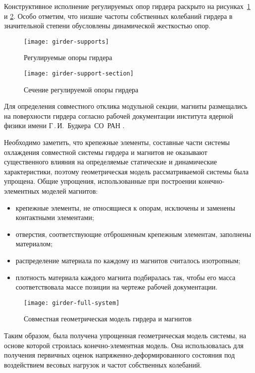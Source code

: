 Конструктивное исполнение регулируемых опор гирдера раскрыто на рисунках~\ref{fig:girder-supports} и \ref{fig:girder-support-section}. Особо отметим, что низшие частоты собственных колебаний гирдера в значительной степени обусловлены динамической жесткостью опор.

\begin{figure}[!htb]
	\centering
	\texttt{[image: girder-supports]}
	\caption{Регулируемые опоры гирдера} \label{fig:girder-supports}
\end{figure}

\begin{figure}[!htb]
	\centering
	\texttt{[image: girder-support-section]}
	\caption{Сечение регулируемой опоры гирдера} \label{fig:girder-support-section}
\end{figure}

Для определения совместного отклика модульной секции, магниты размещались на поверхности гирдера согласно рабочей документации института ядерной физики имени Г\,.\,И.~Будкера~СО~РАН .

Необходимо заметить, что крепежные элементы, составные части системы охлаждения совместной системы гирдера и магнитов не оказывают существенного влияния на определяемые статические и динамические характеристики, поэтому геометрическая модель рассматриваемой системы была упрощена. Общие упрощения, использованные при построении конечно-элементных моделей магнитов:
\begin{itemize}
	\item крепежные элементы, не относящиеся к опорам, исключены и заменены контактными элементами;
	\item отверстия, соответствующие отброшенным крепежным элементам, заполнены материалом;
	\item распределение материала по каждому из магнитов считалось изотропным;
	\item плотность материала каждого магнита подбиралась так, чтобы его масса соответствовала массе позиции на чертеже рабочей документации.
\end{itemize} 

\begin{figure}[!htb]
	\centering
	\texttt{[image: girder-full-system]}
	\caption{Совместная геометрическая модель гирдера и магнитов} \label{fig:girder-full-system}
\end{figure}

Таким образом, была получена упрощенная геометрическая модель системы, на основе которой строилась конечно-элементная модель. Она использовалась для получения первичных оценок напряженно-деформированного состояния под воздействием весовых нагрузок и частот собственных колебаний. 

